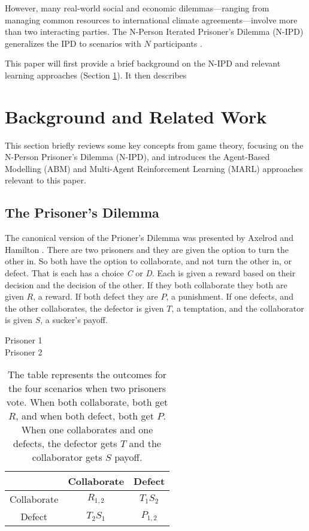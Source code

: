 \documentclass[]{llncs} %
\begin{document}
However, many real-world social and economic dilemmas—ranging from
managing common resources to international climate agreements—involve
more than two interacting parties. The N-Person Iterated Prisoner's
Dilemma (N-IPD) generalizes the IPD to scenarios with $N$ participants
\cite{Hamburger1973}\cite{Hardin1971}.


This paper will first provide a brief background on the N-IPD and
relevant learning approaches (Section \ref{sec:background}). It then
describes

\section{Background and Related Work}
\label{sec:background} 

This section briefly reviews some key concepts from game theory, focusing on the
N-Person Prisoner's Dilemma (N-IPD), and introduces the Agent-Based Modelling
(ABM) and Multi-Agent Reinforcement Learning (MARL) approaches relevant to this
paper. 

\subsection{The Prisoner's Dilemma}
The canonical version of the Prioner's Dilemma was presented by
Axelrod and Hamilton \cite {Axelrod}.  There are two prisoners
and they are given the option to turn the other in.  So both have
the option to collaborate, and not turn the other in, or defect.
That is each has a choice {\it C} or {\it D}.  Each is given a reward
based on their decision and the decision of the other.  If they both
collaborate they both are given $R$, a reward.  If both defect they
are $P$, a punishment.  If one defects, and the other collaborates,
the defector is given $T$, a temptation, and the collaborator is given
$S$, a sucker's payoff.  

\begin {table} [ht]
\begin{center}
  Prisoner 1 \\
    Prisoner 2
  \begin {tabular}{c | c | c |}
& Collaborate &  Defect \\
\hline
Collaborate& $R_{1,2}$ &  $T_1 S_2$ \\
\hline
Defect& $T_2 S_1$ &  $P_{1,2}$ \\
\hline
\end {tabular}
\caption {The table represents the outcomes for the four scenarios when
  two prisoners vote.  When both collaborate, both get $R$, and when
  both defect, both get $P$.  When one collaborates and one defects,
  the defector gets $T$ and the collaborator gets $S$ payoff.}
\label {tabPayoff}
\end {center}
\end {table}
\end{document}
